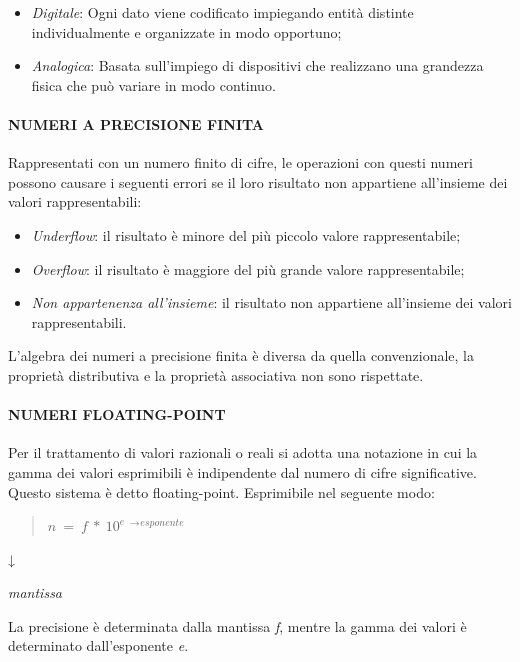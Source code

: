 \begin{itemize}
\item
  \emph{Digitale}: Ogni dato viene codificato impiegando entità distinte
  individualmente e organizzate in modo opportuno;
\item
  \emph{Analogica}: Basata sull'impiego di dispositivi che realizzano
  una grandezza fisica che può variare in modo continuo.
\end{itemize}

\paragraph{NUMERI A PRECISIONE FINITA}\label{numeri-a-precisione-finita}

Rappresentati con un numero finito di cifre, le operazioni con questi
numeri possono causare i seguenti errori se il loro risultato non
appartiene all'insieme dei valori rappresentabili:

\begin{itemize}
\item
  \emph{Underflow}: il risultato è minore del più piccolo valore
  rappresentabile;
\item
  \emph{Overflow}: il risultato è maggiore del più grande valore
  rappresentabile;
\item
  \emph{Non appartenenza all'insieme}: il risultato non appartiene
  all'insieme dei valori rappresentabili.
\end{itemize}

L'algebra dei numeri a precisione finita è diversa da quella
convenzionale, la proprietà distributiva e la proprietà associativa non
sono rispettate.

\paragraph{NUMERI FLOATING-POINT}\label{numeri-floating-point}

Per il trattamento di valori razionali o reali si adotta una notazione
in cui la gamma dei valori esprimibili è indipendente dal numero di
cifre significative. Questo sistema è detto floating-point. Esprimibile
nel seguente modo:

\begin{quote}
\(n\  = \ f\ *\ 10^{e}\) \({}^{\rightarrow}\)\({}^{esponente}\)
\end{quote}

↓

\emph{mantissa}

La precisione è determinata dalla mantissa \emph{f}, mentre la gamma dei
valori è determinato dall'esponente \emph{e}.

